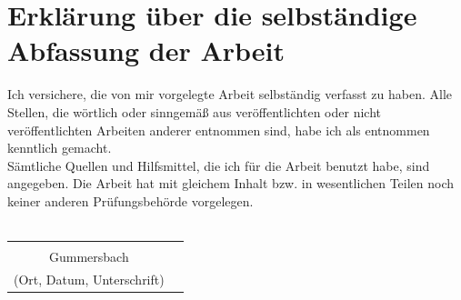 \documentclass[a4paper,12pt,oneside]{article}
\begin{document}
\section*{Erklärung über die selbständige\\Abfassung der Arbeit} %
Ich versichere, die von mir vorgelegte Arbeit selbständig verfasst zu haben.
Alle Stellen, die wörtlich oder sinngemäß aus veröffentlichten oder nicht veröffentlichten Arbeiten anderer entnommen sind,
habe ich als entnommen kenntlich gemacht.\\
Sämtliche Quellen und Hilfsmittel, die ich für die Arbeit benutzt habe, sind
angegeben. Die Arbeit hat mit gleichem Inhalt bzw. in wesentlichen Teilen noch keiner anderen Prüfungsbehörde vorgelegen.\\\\
\begin{tabular}{cp{7cm}}
                                    &             \\
          Gummersbach                   &             \\ \hline
  \small (Ort, Datum, Unterschrift) & \normalsize \\
\end{tabular}


\newpage
\thispagestyle{empty}

\end{document}
